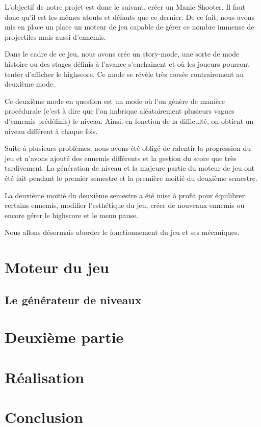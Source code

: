 \documentclass{article}
\begin{document}
L'objectif de notre projet est donc le suivant, créer un Manic Shooter. Il faut donc qu'il est les mêmes atouts et défauts que ce dernier. De ce fait, nous avons mis en place un place un moteur de jeu capable de gérer ce nombre immense de projectiles mais aussi d'ennemis.

Dans le cadre de ce jeu, nous avons crée un story-mode, une sorte de mode histoire ou des stages définis à l'avance s'enchainent et où les joueurs pourront tenter d'afficher le highscore. Ce mode se révèle très corsée contrairement au deuxième mode.

Ce deuxième mode en question est un mode où l'on génère de manière procédurale (c'est à dire que l'on imbrique aléatoirement plusieurs vagues d'ennemis prédéfinis) le niveau. Ainsi, en fonction de la difficulté, on obtient un niveau différent à chaque fois.

Suite à plusieurs problèmes, nous avons été obligé de ralentir la progression du jeu et n'avons ajouté des ennemis différents et la gestion du score que très tardivement. La génération de niveau et la majeure partie du moteur de jeu ont été fait pendant le premier semestre et la première moitié du deuxième semestre.

La deuxième moitié du deuxième semestre a été mise à profit pour équilibrer certains ennemis, modifier l'esthétique du jeu, créer de nouveaux ennemis ou encore gérer le highscore et le menu pause.

Nous allons désormais aborder le fonctionnement du jeu et ses mécaniques.

\section{Moteur du jeu}

\subsection{Le générateur de niveaux}

\section{Deuxième partie}



\section{Réalisation}



\section{Conclusion}
\end{document}
